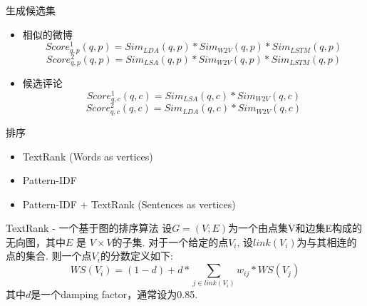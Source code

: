 \documentclass[aspectratio=169]{beamer}
\begin{document}
    \begin{frame}{生成候选集}
      \begin{itemize}
      \item 相似的微博
      \begin{equation}
         Score_{q,p}^1(q, p) = Sim_{LDA}(q, p) * Sim_{W2V}(q, p) * Sim_{LSTM}(q, p)
      \end{equation}
      \begin{equation}
         Score_{q,p}^2(q, p) = Sim_{LSA}(q, p) * Sim_{W2V}(q, p) * Sim_{LSTM}(q, p)
      \end{equation}
      \item 候选评论
      \begin{equation}
         Score_{q,c}^1(q, c) = Sim_{LSA}(q, c) * Sim_{W2V}(q, c)
      \end{equation}
      \begin{equation}
         Score_{q,c}^2(q, c) = Sim_{LDA}(q, c) * Sim_{W2V}(q, c)
      \end{equation}
    \end{itemize}
    \end{frame}

    \begin{frame}{排序}
      \begin{itemize}
        \item TextRank (Words as vertices)
        \item Pattern-IDF
        \item Pattern-IDF + TextRank (Sentences as vertices)
      \end{itemize}
    \end{frame}

    \begin{frame}{TextRank - 一个基于图的排序算法}
      设$G = (V; E)$为一个由点集V和边集E构成的无向图，其中$E$ 是 $V \times V$的子集. 对于一个给定的点$V_i$, 设$link(V_i)$为与其相连的点的集合. 则一个点$V_i$的分数定义如下:
      \begin{equation}
        WS(V_i) = (1 - d) + d * \sum_{j \in link(V_i)}{w_{ij} * WS({V_j})}
      \end{equation}
      其中$d$是一个damping factor\footnotemark，通常设为0.85.

    \end{frame}
\end{document}
